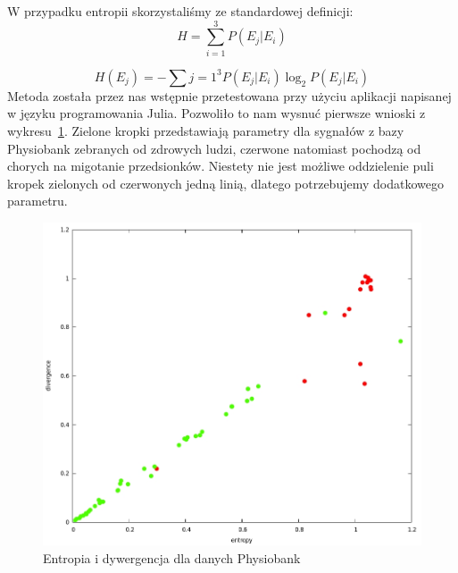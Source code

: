 W przypadku entropii skorzystaliśmy ze standardowej definicji:
\begin{equation}
H = \sum_{i=1}^3 P(E_j|E_i) 
\end{equation}

\begin{equation}
H(E_j) = - \sum{j=1}^3P(E_j|E_i)\log_2P(E_j|E_i)
\end{equation}
Metoda została przez nas wstępnie przetestowana przy użyciu aplikacji napisanej w języku programowania Julia. 
Pozwoliło to nam wysnuć pierwsze wnioski z wykresu~\ref{fig:RRResults}.
Zielone kropki przedstawiają parametry dla sygnałów z bazy Physiobank zebranych od zdrowych ludzi,
czerwone natomiast pochodzą od chorych na migotanie przedsionków. 
Niestety nie jest możliwe oddzielenie puli kropek zielonych od czerwonych jedną linią, 
dlatego potrzebujemy dodatkowego parametru.

\begin{figure}[ht]
\centering
\includegraphics[width=12cm]{ATRIAL_FIBR/img/RRResults.jpg}
\caption{Entropia i dywergencja dla danych Physiobank}
\label{fig:RRResults}
\end{figure}

